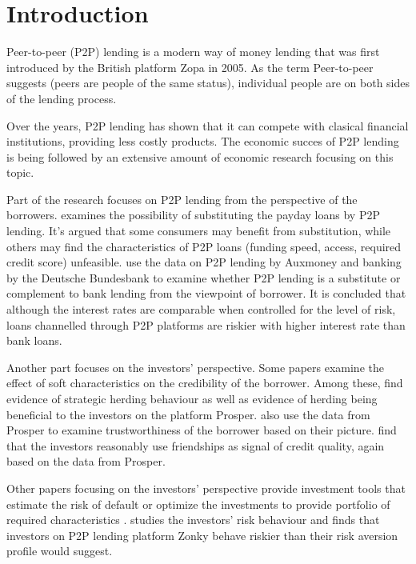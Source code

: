
\section*{Introduction}
Peer-to-peer (P2P) lending is a modern way of money lending that was first introduced by the British platform Zopa in 2005. As the term Peer-to-peer suggests (peers are people of the same status), individual people are on both sides of the lending process. 

Over the years, P2P lending has shown that it can compete with clasical financial institutions, providing less costly products. The economic succes of P2P lending is being followed by an extensive amount of economic research focusing on this topic. 

Part of the research focuses on P2P lending from the perspective of the borrowers. \cite{Livingston2012} 
examines the possibility of substituting the payday loans by P2P lending. It's argued that some consumers may benefit from substitution, while others may find the characteristics of P2P loans (funding speed, access, required credit score) unfeasible. \cite{deRoure2016} 
use the data on P2P lending by Auxmoney and banking by the Deutsche Bundesbank to examine whether P2P lending is a substitute or complement to bank lending from the viewpoint of borrower. It is concluded that although the interest rates are comparable when controlled for the level of risk, loans channelled through P2P platforms are riskier with higher interest rate than bank loans.

Another part focuses on the investors' perspective. Some papers examine the effect of soft characteristics on the credibility of the borrower. Among these, \cite{Herzenstein2011} find evidence of strategic herding behaviour as well as evidence of herding being beneficial to the investors on the platform Prosper. \cite{Duarte2012} also use the data from Prosper to examine trustworthiness of the borrower based on their picture. \cite{Lin2013} find that the investors reasonably use friendships as signal of credit quality, again based on the data from Prosper.

Other papers focusing on the investors' perspective provide investment tools that estimate the risk of default \cite[]{Mild2015} or optimize the investments to provide portfolio of required characteristics \cite[]{Guo2016}. \cite{Hudcova2017} studies the investors’ risk behaviour and finds that investors on P2P lending platform Zonky behave riskier than their risk aversion profile would suggest.

